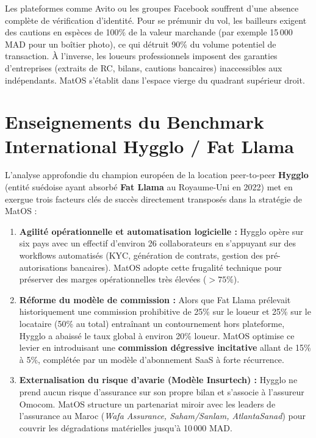 \documentclass[11pt,a4paper]{report}
\begin{document}
Les plateformes comme Avito ou les groupes Facebook souffrent d'une absence complète de vérification d'identité. Pour se prémunir du vol, les bailleurs exigent des cautions en espèces de 100\% de la valeur marchande (par exemple 15\,000 MAD pour un boîtier photo), ce qui détruit 90\% du volume potentiel de transaction. À l'inverse, les loueurs professionnels imposent des garanties d'entreprises (extraits de RC, bilans, cautions bancaires) inaccessibles aux indépendants. MatOS s'établit dans l'espace vierge du quadrant supérieur droit.

\section{Enseignements du Benchmark International Hygglo / Fat Llama}
L'analyse approfondie du champion européen de la location peer-to-peer \textbf{Hygglo} (entité suédoise ayant absorbé \textbf{Fat Llama} au Royaume-Uni en 2022) met en exergue trois facteurs clés de succès directement transposés dans la stratégie de MatOS :

\begin{enumerate}[leftmargin=*]
    \item \textbf{Agilité opérationnelle et automatisation logicielle :} Hygglo opère sur six pays avec un effectif d'environ 26 collaborateurs en s'appuyant sur des workflows automatisés (KYC, génération de contrats, gestion des pré-autorisations bancaires). MatOS adopte cette frugalité technique pour préserver des marges opérationnelles très élevées ($>75\%$).
    \item \textbf{Réforme du modèle de commission :} Alors que Fat Llama prélevait historiquement une commission prohibitive de 25\% sur le loueur et 25\% sur le locataire (50\% au total) entraînant un contournement hors plateforme, Hygglo a abaissé le taux global à environ 20\% loueur. MatOS optimise ce levier en introduisant une \textbf{commission dégressive incitative} allant de 15\% à 5\%, complétée par un modèle d'abonnement SaaS à forte récurrence.
    \item \textbf{Externalisation du risque d'avarie (Modèle Insurtech) :} Hygglo ne prend aucun risque d'assurance sur son propre bilan et s'associe à l'assureur Omocom. MatOS structure un partenariat miroir avec les leaders de l'assurance au Maroc (\textit{Wafa Assurance, Saham/Sanlam, AtlantaSanad}) pour couvrir les dégradations matérielles jusqu'à 10\,000 MAD.
\end{enumerate}
\end{document}
